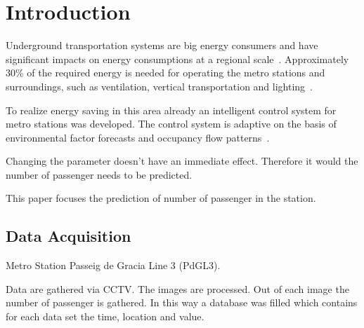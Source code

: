 \section{Introduction}
\label{sec:introduction}

Underground transportation systems are big energy consumers and have significant impacts on energy consumptions at a regional scale~\cite{anderson_maximizing_2009}. Approximately 30\% of the required energy is needed for operating the metro stations and surroundings, such as ventilation, vertical transportation and lighting~\cite{TMB}.

To realize energy saving in this area already an intelligent control system for metro stations was developed. The control system is adaptive on the basis of environmental factor forecasts and occupancy flow patterns~\cite{guo_intelligent_2013}.

Changing the parameter doesn't have an immediate effect. Therefore it would the number of passenger needs to be predicted.

This paper focuses the prediction of number of passenger in the station.



\subsection{Data Acquisition}
\label{subsec:dataAcquisition}

Metro Station Passeig de Gracia Line 3 (PdGL3).

Data are gathered via CCTV. The images are processed. Out of each image the number of passenger is gathered. In this way a database was filled which contains for each data set the time, location and value.